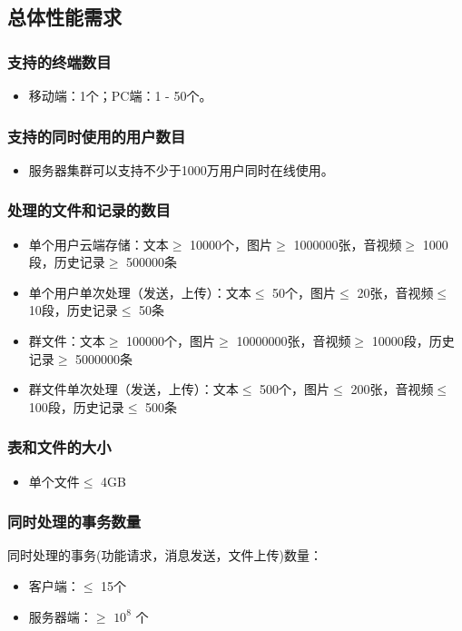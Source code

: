 \subsection{总体性能需求}

\subsubsection{支持的终端数目}
\begin{itemize}
	\item 移动端：1个；PC端：1 - 50个。
\end{itemize}
\subsubsection{支持的同时使用的用户数目}
\begin{itemize}
	\item 服务器集群可以支持不少于1000万用户同时在线使用。
\end{itemize}
\subsubsection{处理的文件和记录的数目}
\begin{itemize}
	\item 单个用户云端存储：文本$\geq$ 10000个，图片$\geq$ 1000000张，音视频$\geq$ 1000段，历史记录$\geq$ 500000条
	\item 单个用户单次处理（发送，上传）：文本$\leq$ 50个，图片$\leq$ 20张，音视频$\leq$ 10段，历史记录$\leq$ 50条
	\item 群文件：文本$\geq$ 100000个，图片$\geq$ 10000000张，音视频$\geq$ 10000段，历史记录$\geq$ 5000000条
	\item 群文件单次处理（发送，上传）：文本$\leq$ 500个，图片$\leq$ 200张，音视频$\leq$ 100段，历史记录$\leq$ 500条
\end{itemize}
\subsubsection{表和文件的大小}
\begin{itemize}
	\item 单个文件$\leq$ 4GB
\end{itemize}
\subsubsection{同时处理的事务数量}
同时处理的事务(功能请求，消息发送，文件上传)数量：
\begin{itemize}
	\item 客户端：$\leq$ 15个
	\item 服务器端：$\geq$ $10^{8}$ 个
\end{itemize}
